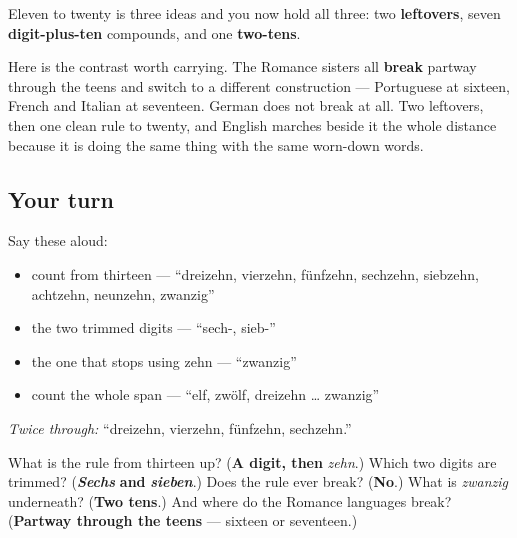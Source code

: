 \begin{culture}
Eleven to twenty is three ideas and you now hold all three: two \textbf{leftovers}, seven \textbf{digit-plus-ten} compounds, and one \textbf{two-tens}.

Here is the contrast worth carrying. The Romance sisters all \textbf{break} partway through the teens and switch to a different construction — Portuguese at sixteen, French and Italian at seventeen. German does not break at all. Two leftovers, then one clean rule to twenty, and English marches beside it the whole distance because it is doing the same thing with the same worn-down words.
\end{culture}

\subsection*{Your turn}
Say these aloud:

\begin{itemize}
\raggedright
  \item count from thirteen — \textquotedblleft{}dreizehn, vierzehn, fünfzehn, sechzehn, siebzehn, achtzehn, neunzehn, zwanzig\textquotedblright{}
  \item the two trimmed digits — \textquotedblleft{}sech-, sieb-\textquotedblright{}
  \item the one that stops using zehn — \textquotedblleft{}zwanzig\textquotedblright{}
  \item count the whole span — \textquotedblleft{}elf, zwölf, dreizehn … zwanzig\textquotedblright{}
\end{itemize}

\emph{Twice through:} \textquotedblleft{}dreizehn, vierzehn, fünfzehn, sechzehn.\textquotedblright{}

\begin{tcolorbox}[breakable,colback=teal!4,colframe=teal!35!black,title={Before you move on}]
What is the rule from thirteen up? (\textbf{A digit, then} \emph{zehn}.) Which two digits are trimmed? (\emph{\textbf{Sechs}} \textbf{and} \emph{\textbf{sieben}}.) Does the rule ever break? (\textbf{No}.) What is \emph{zwanzig} underneath? (\textbf{Two tens}.) And where do the Romance languages break? (\textbf{Partway through the teens} — sixteen or seventeen.)
\end{tcolorbox}
